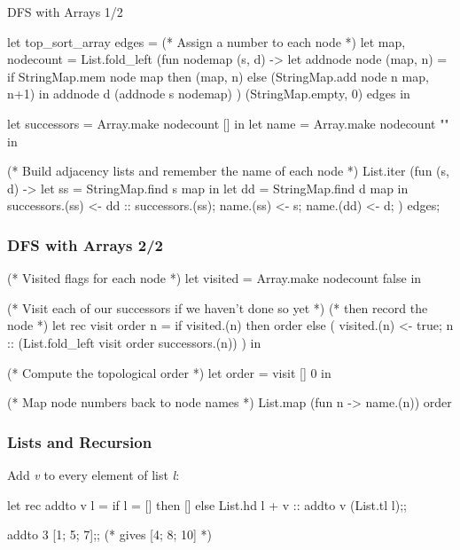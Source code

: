 \documentclass{plt}
\begin{document}
\begin{frame}[fragile]{DFS with Arrays 1/2}

\begin{ocaml}
let top_sort_array edges =
  (* Assign a number to each node *)
  let map, nodecount =
    List.fold_left
      (fun nodemap (s, d) ->
        let addnode node (map, n) =
          if StringMap.mem node map then (map, n)
          else (StringMap.add node n map, n+1)
        in
        addnode d (addnode s nodemap)
      ) (StringMap.empty, 0) edges
  in

  let successors = Array.make nodecount [] in
  let name = Array.make nodecount "" in

  (* Build adjacency lists and remember the name of each node *)
  List.iter
    (fun (s, d) ->
      let ss = StringMap.find s map in
      let dd = StringMap.find d map in
      successors.(ss) <- dd :: successors.(ss);
      name.(ss) <- s;
      name.(dd) <- d;
    ) edges;
\end{ocaml}

\end{frame}

\begin{frame}[fragile]
  \frametitle{DFS with Arrays 2/2}

\begin{ocaml}
  (* Visited flags for each node *)
  let visited = Array.make nodecount false in

  (* Visit each of our successors if we haven't done so yet *)
  (* then record the node *)
  let rec visit order n =
    if visited.(n) then order
    else (
      visited.(n) <- true;
      n :: (List.fold_left visit order successors.(n))
     )
  in

  (* Compute the topological order *)
  let order = visit [] 0 in

  (* Map node numbers back to node names *)
  List.map (fun n -> name.(n)) order
\end{ocaml}

\end{frame}



\begin{frame}[fragile]
  \frametitle{Lists and Recursion}

Add \emph{v} to every element of list \emph{l}:

\begin{ocaml}
let rec addto v l =
  if l = [] then [] else
  List.hd l + v :: addto v (List.tl l);;

addto 3 [1; 5; 7];; (* gives [4; 8; 10] *)
\end{ocaml}
\end{frame}
\end{document}
